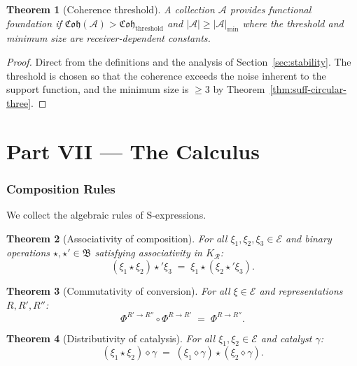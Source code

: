 \documentclass[twocolumn,11pt,a4paper]{article}
\theoremstyle{thmstyle}
\newtheorem{theorem}{Theorem}[section]
\theoremstyle{thmstyle}
\theoremstyle{definition}
\theoremstyle{remark}
\newcommand{\Expr}{\mathcal{E}}
\newcommand{\Ax}{\mathcal{A}}
\newcommand{\Cohere}{\mathfrak{Coh}}
\newcommand{\receiver}{\mathcal{R}}
\begin{document}
\begin{theorem}[Coherence threshold]\label{thm:coh-threshold}
A collection $\Ax$ provides functional foundation if
$\Cohere(\Ax) > \Cohere_{\mathrm{threshold}}$ and
$|\Ax| \geq |\Ax|_{\min}$ where the threshold and
minimum size are receiver-dependent constants.
\end{theorem}

\begin{proof}
Direct from the definitions and the analysis of
Section~\ref{sec:stability}.  The threshold is
chosen so that the coherence exceeds the noise
inherent to the support function, and the minimum
size is $\geq 3$ by Theorem~\ref{thm:suff-circular-three}.
\end{proof}



\part*{Part VII --- The Calculus}

\section{Composition Rules}
\label{sec:composition-rules}

We collect the algebraic rules of S-expressions.

\begin{theorem}[Associativity of composition]
\label{thm:assoc}
For all $\xi_{1}, \xi_{2}, \xi_{3} \in \Expr$ and
binary operations $\star, \star' \in \mathfrak{B}$
satisfying associativity in $K_{\receiver}$:
\[
(\xi_{1} \star \xi_{2}) \star' \xi_{3}
\;=\; \xi_{1} \star (\xi_{2} \star' \xi_{3}).
\]
\end{theorem}

\begin{theorem}[Commutativity of conversion]
\label{thm:comm-conv}
For all $\xi \in \Expr$ and representations
$R, R', R''$:
\[
\Phi^{R' \to R''} \circ \Phi^{R \to R'}
\;=\; \Phi^{R \to R''}.
\]
\end{theorem}

\begin{theorem}[Distributivity of catalysis]
\label{thm:dist-cat}
For all $\xi_{1}, \xi_{2} \in \Expr$ and catalyst
$\gamma$:
\[
(\xi_{1} \star \xi_{2}) \diamond \gamma
\;=\; (\xi_{1} \diamond \gamma) \star
        (\xi_{2} \diamond \gamma).
\]
\end{theorem}
\end{document}
